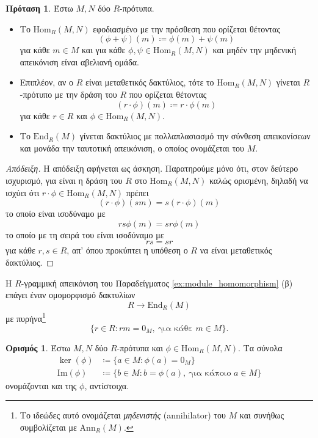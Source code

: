 \documentclass[12pt,a4paper,reqno]{amsart}
\theoremstyle{definition}
\newtheorem{proposition}[theorem]{Πρόταση}
\newtheorem{definition}[theorem]{Ορισμός}
\theoremstyle{remark}
\numberwithin{theorem}{section}
\numberwithin{exercise}{section}
\numberwithin{equation}{section}
\renewcommand{\to}{\rightarrow}
\newcommand{\rmIm}{\mathrm{Im}}
\newcommand{\End}{\mathrm{End}}
\newcommand{\Hom}{\mathrm{Hom}}
\newcommand{\Ann}{\mathrm{Ann}}
\newcommand{\defn}[1]{{\color{mylightblue}{#1}}}
\begin{document}
\begin{proposition}
    \label{prop:Hom}
    Έστω $M, N$ δύο $R$-πρότυπα. 
    \begin{itemize}
        \item Το $\Hom_R(M,N)$ εφοδιασμένο με την πρόσθεση που ορίζεται θέτοντας
        \[
        (\phi + \psi)(m) \coloneqq \phi(m) + \psi(m) 
        \]
        για κάθε $m \in M$ και για κάθε $\phi, \psi \in \Hom_R(M,N)$ και μηδέν την μηδενική απεικόνιση είναι αβελιανή ομάδα.
        \item Επιπλέον, αν ο $R$ είναι μεταθετικός δακτύλιος, τότε το $\Hom_R(M,N)$ γίνεται $R$-πρότυ\-πο με την δράση του $R$ που ορίζεται θέτοντας
        \[
        \left(r\cdot\phi\right)(m) \coloneqq r\cdot\phi(m)
        \]
        για κάθε $r \in R$ και $\phi \in \Hom_R(M,N)$.
        \item Το $\End_R(M)$ γίνεται δακτύλιος με πολλαπλασιασμό την σύνθεση απεικονίσεων και μονάδα την ταυτοτική απεικόνιση, ο οποίος ονομάζεται \defn{δακτύλιος ενδομορφισμών} του $M$.
    \end{itemize}
\end{proposition}

\begin{proof}[Απόδειξη]
    Η απόδειξη αφήνεται ως άσκηση. Παρατηρούμε μόνο ότι, στον δεύτερο ισχυρισμό, για είναι η δράση του $R$ στο $\Hom_R(M,N)$ καλώς ορισμένη, δηλαδή να ισχύει ότι $r\cdot \phi \in \Hom_R(M,N)$ πρέπει
    \[
    \left(r\cdot\phi\right)(sm) = s\left(r\cdot\phi\right)(m)
    \]
    το οποίο είναι ισοδύναμο με 
    \[
    rs\phi(m) = sr\phi(m)
    \]
    το οποίο με τη σειρά του είναι ισοδύναμο με 
    \[
    rs = sr
    \]
    για κάθε $r, s \in R$, απ' όπου προκύπτει η υπόθεση ο $R$ να είναι μεταθετικός δακτύλιος.
\end{proof}

Η $R$-γραμμική απεικόνιση του Παραδείγματος \ref{ex:module_homomorphism} (β) επάγει έναν ομομορφισμό δακτυλίων 
\[
R \to \End_R(M)
\]
με πυρήνα\footnote{Το ιδεώδες αυτό ονομάζεται \emph{μηδενιστής} (annihilator) του $M$ και συνήθως συμβολίζεται με $\Ann_R(M)$.}
\[
\{r \in R : rm = 0_M, \ \text{για κάθε $m \in M$}\}.
\]

\begin{definition}
    \label{def:kernel_image}
    Έστω $M, N$ δύο $R$-πρότυπα και $\phi \in \Hom_R(M,N)$. Τα σύνολα 
    \begin{align*}
        \ker(\phi) &\coloneqq \{a \in M : \phi(a) = 0_M\} \\
        \rmIm(\phi) &\coloneqq \{b \in M : b = \phi(a), \ \text{για κάποιο $a \in M$}\} 
    \end{align*}
    ονομάζονται \defn{πυρήνας} και \defn{εικόνα} της $\phi$, αντίστοιχα.
\end{definition}
\end{document}
